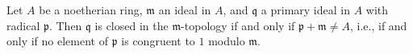 Let $A$ be a noetherian ring, $\mathfrak{m}$ an ideal in $A$, and $\mathfrak{q}$ a primary ideal in $A$ with radical $\mathfrak{p}$. Then $\mathfrak{q}$ is closed in the $\mathfrak{m}$-topology if and only if $\mathfrak{p} + \mathfrak{m} \neq A$, i.e., if and only if no element of $\mathfrak{p}$ is congruent to $1$ modulo $\mathfrak{m}$.